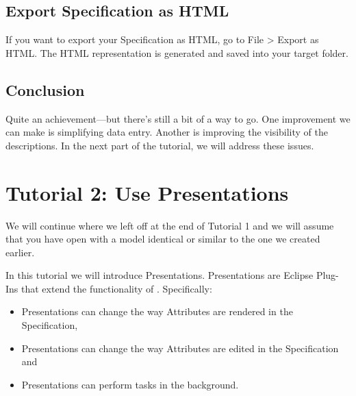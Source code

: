 \subsection{Export Specification as HTML}

If you want to export your Specification as HTML, go to File \textgreater{} Export as HTML.  The HTML representation is generated and saved into your target folder.

\subsection{Conclusion}

Quite an achievement—but there's still a bit of a way to go.  One improvement we can make is simplifying data entry.  Another is improving  the visibility of the descriptions.  In the next part of the tutorial, we will address these issues.

\section{Tutorial 2: Use Presentations}

We will continue where we left off at the end of Tutorial 1 and we will assume that you have \pror{} open with a model identical or similar to the one we created earlier.

In this tutorial we will introduce Presentations.  Presentations are Eclipse Plug-Ins that extend the functionality of \pror{}.  Specifically:

\begin{itemize}
\item
  Presentations can change the way Attributes are rendered in the Specification,
\item
  Presentations can change the way Attributes are edited in the Specification and
\item
  Presentations can perform tasks in the background.
\end{itemize}

